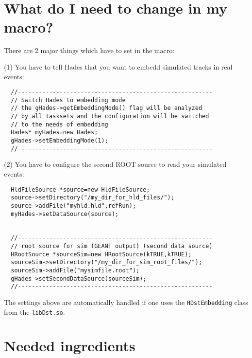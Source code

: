\section{What do I need to change in my macro?}

There are 2 major things which have to set in the macro:

  (1) You have to tell Hades that you want to embedd simulated 
  tracks in real events:

\begin{lstlisting}
  //--------------------------------------------------------
  // Switch Hades to embedding mode
  // the gHades->getEmbeddingMode() flag will be analyzed
  // by all tasksets and the configuration will be switched
  // to the needs of embedding
  Hades* myHades=new Hades;
  gHades->setEmbeddingMode(1);
  //--------------------------------------------------------
\end{lstlisting}

  (2) You have to configure the second ROOT source to read your 
  simulated events:

\begin{lstlisting}
  HldFileSource *source=new HldFileSource;
  source->setDirectory("/my_dir_for_hld_files/");
  source->addFile("myhld.hld",refRun);
  myHades->setDataSource(source);


  //--------------------------------------------------------
  // root source for sim (GEANT output) (second data source)
  HRootSource *sourceSim=new HRootSource(kTRUE,kTRUE);
  sourceSim->setDirectory("/my_dir_for_sim_root_files/");
  sourceSim->addFile("mysimfile.root");
  gHades->setSecondDataSource(sourceSim);
  //--------------------------------------------------------
\end{lstlisting}

The settings above are automatically handled if one uses the 
\verb+HDstEmbedding+ class from the \verb+libDst.so+.

\section{Needed ingredients}

